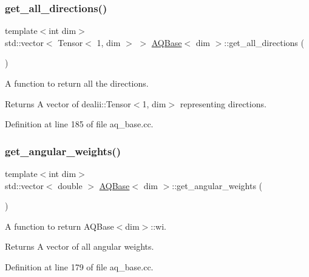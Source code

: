 \subsubsection{\texorpdfstring{get\+\_\+all\+\_\+directions()}{get\_all\_directions()}}
{\footnotesize\ttfamily template$<$int dim$>$ \\
std\+::vector$<$ Tensor$<$ 1, dim $>$ $>$ \hyperlink{class_a_q_base}{A\+Q\+Base}$<$ dim $>$\+::get\+\_\+all\+\_\+directions (\begin{DoxyParamCaption}{ }\end{DoxyParamCaption})}

A function to return all the directions.

\begin{DoxyReturn}{Returns}
A vector of dealii\+::\+Tensor$<$1, dim$>$ representing directions. 
\end{DoxyReturn}


Definition at line 185 of file aq\+\_\+base.\+cc.

\mbox{\label{class_a_q_base_ac3db7e901486ff088e4eac2f1401f3b6}} 
\subsubsection{\texorpdfstring{get\+\_\+angular\+\_\+weights()}{get\_angular\_weights()}}
{\footnotesize\ttfamily template$<$int dim$>$ \\
std\+::vector$<$ double $>$ \hyperlink{class_a_q_base}{A\+Q\+Base}$<$ dim $>$\+::get\+\_\+angular\+\_\+weights (\begin{DoxyParamCaption}{ }\end{DoxyParamCaption})}

A function to return A\+Q\+Base$<$dim$>$\+::wi.

\begin{DoxyReturn}{Returns}
A vector of all angular weights. 
\end{DoxyReturn}


Definition at line 179 of file aq\+\_\+base.\+cc.

\mbox{\label{class_a_q_base_a016f7ac88052a26c82c8aa3bfba80f73}} 

